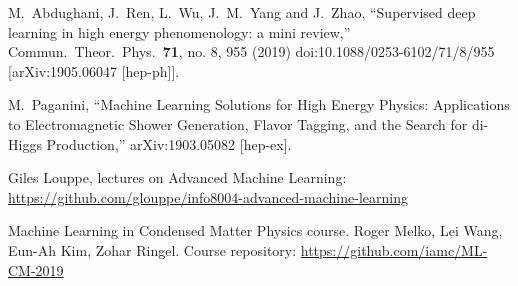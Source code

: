 \documentclass[12pt]{article}
\numberwithin{equation}{section}
\begin{document}
\begin{spacing}{1.1}
\begin{thebibliography}{99}
  M.~Abdughani, J.~Ren, L.~Wu, J.~M.~Yang and J.~Zhao,
  ``Supervised deep learning in high energy phenomenology: a mini review,''
  Commun.\ Theor.\ Phys.\  {\bf 71}, no. 8, 955 (2019)
  doi:10.1088/0253-6102/71/8/955
  [arXiv:1905.06047 [hep-ph]].

 

  M.~Paganini,
  ``Machine Learning Solutions for High Energy Physics: Applications to Electromagnetic Shower Generation, Flavor Tagging, and the Search for di-Higgs Production,''
  arXiv:1903.05082 [hep-ex].

  Giles Louppe, lectures on Advanced
  Machine Learning: \url{https://github.com/glouppe/info8004-advanced-machine-learning}


  Machine Learning in Condensed Matter Physics course.
  Roger Melko, Lei Wang, Eun-Ah Kim, Zohar Ringel.
  Course repository:
\url{https://github.com/iamc/ML-CM-2019}
  

  \end{thebibliography}

\end{spacing}
\end{document}
